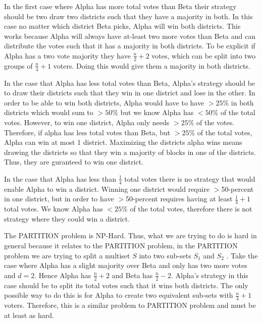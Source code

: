 \documentclass[12pt]{article}%
\begin{document}
In the first case where Alpha has more total votes than Beta their strategy should be two draw two districts such that they have a majority in both.  In this case no matter which district Beta picks, Alpha will win both districts.  This works because Alpha will always have at-least two more votes than Beta and can distribute the votes such that it has a majority in both districts.  To be explicit if Alpha has a two vote majority they have $\frac{n}{2} + 2$ votes, which can be split into two groups of $\frac{n}{4} + 1$ voters.  Doing this would give them a majority in both districts.
\newline

In the case that Alpha has less total votes than Beta, Alpha's strategy should be to draw their districts such that they win in one district and lose in the other. In order to be able to win both districts, Alpha would have to have $> 25 \%$ in both districts which would sum to $> 50\%$ but we know Alpha has $ < 50\%$ of the total votes. However, to win one district, Alpha only needs $> 25\%$ of the votes. Therefore, if alpha has less total votes than Beta, but $> 25\%$ of the total votes, Alpha can win at most 1 district. Maximizing the districts alpha wins means drawing the districts so that they win a majority of blocks in one of the districts. Thus, they are guranteed to win one district.
\newline

In the case that Alpha has less than $\frac{1}{4}$ total votes there is no strategy that would enable Alpha to win a district. Winning one district would require $>$50-percent in one district, but in order to have $>$50-percent requires having at least $\frac{1}{4} + 1$ total votes. We know Alpha has $< 25\%$ of the total votes, therefore there is not strategy where they could win a district.
\newline

The PARTITION problem is NP-Hard.  Thus, what we are trying to do is hard in general because it relates to the PARTITION problem, in the PARTITION problem we are trying to split a multiset $S$ into two sub-sets $S_1$ and $S_2$ .  Take the case where Alpha has a slight majority over Beta and only has two more votes and $d=2$.  Hence Alpha has $\frac{n}{2} + 2$ and Beta has $\frac{n}{2} - 2$.  Alpha's strategy in this case should be to split its total votes such that it wins both districts.  The only possible way to do this is for Alpha to create two equivalent sub-sets with  $\frac{n}{4} + 1$ voters.  Therefore, this is a similar problem to PARTITION problem and must be at least as hard.
\end{document}
